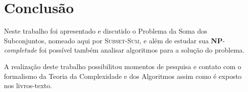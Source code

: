 \section{Conclusão \label{sec:conclusao}}

Neste trabalho foi apresentado e discutido o Problema da Soma dos Subconjuntos, nomeado aqui por \textsc{Subset-Sum}, e além de estudar sua \textbf{NP}-\textit{completude} foi possível também analisar algoritmos para a solução do problema.

A realização deste trabalho possibilitou momentos de pesquisa e contato com o formalismo da Teoria da Complexidade e dos Algoritmos assim como é exposto nos livros-texto.

